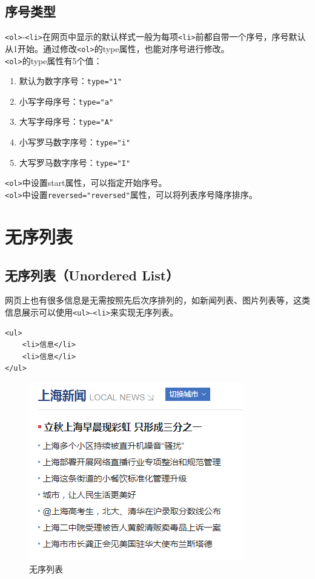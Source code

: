 \subsection{序号类型}

\lstinline|<ol>|-\lstinline|<li>|在网页中显示的默认样式一般为每项\lstinline|<li>|前都自带一个序号，序号默认从1开始。通过修改\lstinline|<ol>|的type属性，也能对序号进行修改。 \\

\lstinline|<ol>|的type属性有5个值：

\begin{enumerate}
    \item 默认为数字序号：\lstinline|type="1"|
    \item 小写字母序号：\lstinline|type="a"|
    \item 大写字母序号：\lstinline|type="A"|
    \item 小写罗马数字序号：\lstinline|type="i"|
    \item 大写罗马数字序号：\lstinline|type="I"|
\end{enumerate}

\lstinline|<ol>|中设置start属性，可以指定开始序号。 \\

\lstinline|<ol>|中设置\lstinline|reversed="reversed"|属性，可以将列表序号降序排序。

\newpage

\section{无序列表}

\subsection{无序列表（Unordered List）}

网页上也有很多信息是无需按照先后次序排列的，如新闻列表、图片列表等，这类信息展示可以使用\lstinline|<ul>|-\lstinline|<li>|来实现无序列表。

\begin{lstlisting}[style=htmlcssjs]
<ul>
    <li>信息</li>
    <li>信息</li>
</ul>
\end{lstlisting}

\begin{figure}[H]
    \centering
    \includegraphics[scale=0.8]{img/C3/3-2/1.png}
    \caption{无序列表}
\end{figure}

